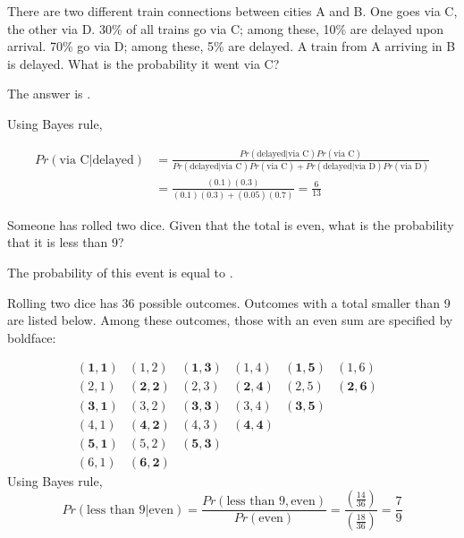 \documentclass{ximera}
\begin{document}
\begin{question}
There are two different train connections between cities A and B.  One
goes via C, the other via D.  30\% of all trains go via C; among
these, 10\% are delayed upon arrival.  70\% go via D; among these, 5\%
are delayed.  A train from A arriving in B is delayed.  What is the
probability it went via C?
\begin{solution}
The answer is .
\end{solution}
Using Bayes rule,


\begin{align*}
Pr (\text{via C} | \text{delayed}) &= \frac{Pr(\text{delayed} | \text{via C}) Pr(\text{via C})}{Pr(\text{delayed} | \text{via C}) Pr(\text{via C}) + Pr(\text{delayed} | \text{via D}) Pr(\text{via D})} \\
& = \frac{(0.1)(0.3)}{(0.1)(0.3) + (0.05)(0.7)} = \frac{6}{13}
\end{align*}
\end{question}

\begin{question}
Someone has rolled two dice.  Given that the total is even, what is
the probability that it is less than 9?
\begin{solution}
The probability of this event is equal to .
\end{solution}
Rolling two dice has 36 possible outcomes. Outcomes with a total smaller than 9 are listed below. Among these outcomes, those with an even sum are specified by boldface:


\[
\begin{matrix}
\mathbf{(1,1)} & (1,2) & \mathbf{(1,3)} & (1,4) & \mathbf{(1,5)} & (1,6) \\
(2,1) & \mathbf{(2,2)} & (2,3) & \mathbf{(2,4)} & (2,5) & \mathbf{(2,6)} \\
\mathbf{(3,1)} & (3,2) & \mathbf{(3,3)} & (3,4) & \mathbf{(3,5)} && \\
(4,1) & \mathbf{(4,2)} & (4,3) & \mathbf{(4,4)} &&& \\
\mathbf{(5,1)} & (5,2) & \mathbf{(5,3)} &&&& \\
(6,1) & \mathbf{(6,2)}
\end{matrix}
\]
Using Bayes rule,
\[
Pr (\text{less than 9} | \text{even}) = \frac{Pr(\text{less than 9},
  \text{even})}{Pr(\text{even})} =
\frac{(\frac{14}{36})}{(\frac{18}{36})} = \frac{7}{9}
\]
\end{question}
\end{document}

